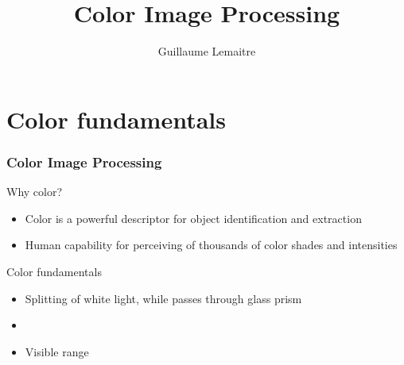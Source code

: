 \documentclass{beamer}
\title{Color Image Processing}
\author{Guillaume Lemaitre}
\institute{Universit\'e de Bourgogne}
\begin{document}
\begin{frame}
  \titlepage
\end{frame}

\begin{frame}
  \tableofcontents[sectionstyle=show,subsectionstyle=show,subsubsectionstyle=hide]
\end{frame}

\section{Color fundamentals}
\begin{frame}
\frametitle{Color Image Processing}
\begin{block}{Why color? }
\begin{itemize}
	\item Color is a powerful descriptor for object identification and extraction
	\item Human capability for perceiving of thousands of color shades and intensities
\end{itemize}
\end{block}
\begin{block}{Color fundamentals}
\begin{itemize}
	\item Splitting of white light, while passes through glass prism
	\item[]
	\item[] Visible range
\end{itemize}
\end{block}
\end{frame}
\end{document}
